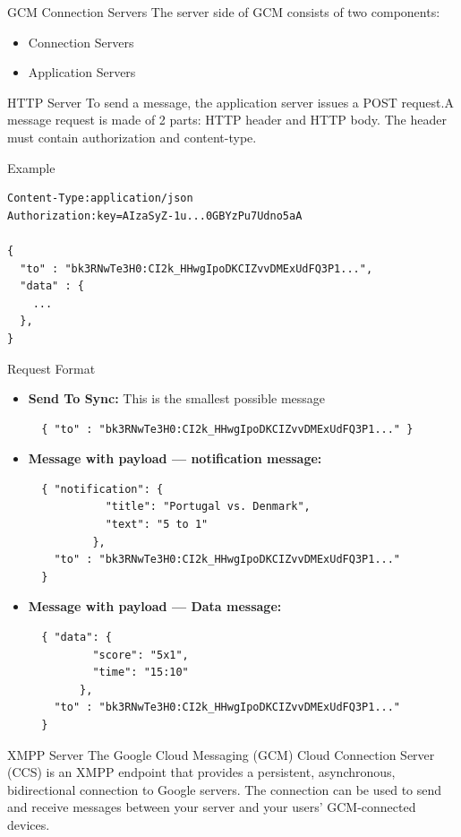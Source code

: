 \documentclass[10pt]{beamer}
\begin{document}
\begin{frame}[fragile]{GCM Connection Servers}
The server side of GCM consists of two components:
\begin{itemize}
  \item Connection Servers 
  \item Application Servers
\end{itemize}
\end{frame}
\begin{frame}[fragile]{HTTP Server}
To send a message, the application server issues a POST request.A message request is made of 2 parts: HTTP header and HTTP body. The header must contain authorization and content-type.
\end{frame}
\begin{frame}[fragile]{Example}
\begin{lstlisting}
Content-Type:application/json
Authorization:key=AIzaSyZ-1u...0GBYzPu7Udno5aA

{
  "to" : "bk3RNwTe3H0:CI2k_HHwgIpoDKCIZvvDMExUdFQ3P1...",
  "data" : {
    ...
  },
}
\end{lstlisting}
\end{frame}
\begin{frame}[fragile]{Request Format}
\begin{itemize}
  \item \small\textbf{Send To Sync: } This is the smallest possible message
    \begin{lstlisting}
  { "to" : "bk3RNwTe3H0:CI2k_HHwgIpoDKCIZvvDMExUdFQ3P1..." }
    \end{lstlisting}
  \item \small\textbf{Message with payload — notification message: }
  \begin{lstlisting}
  { "notification": {
            "title": "Portugal vs. Denmark",
            "text": "5 to 1"
          },
    "to" : "bk3RNwTe3H0:CI2k_HHwgIpoDKCIZvvDMExUdFQ3P1..."
  }
    \end{lstlisting} 
  \item \small\textbf{Message with payload — Data message: }
  \begin{lstlisting}
  { "data": {
          "score": "5x1",
          "time": "15:10"
        },
    "to" : "bk3RNwTe3H0:CI2k_HHwgIpoDKCIZvvDMExUdFQ3P1..."
  }
    \end{lstlisting} 
\end{itemize}

\end{frame}
\begin{frame}[fragile]{XMPP Server}
The Google Cloud Messaging (GCM) Cloud Connection Server (CCS) is an XMPP endpoint that provides a persistent, asynchronous, bidirectional connection to Google servers. The connection can be used to send and receive messages between your server and your users' GCM-connected devices.
\end{frame}
\end{document}
